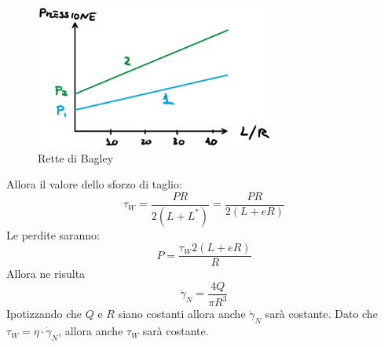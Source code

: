 \begin{figure}
\centering
\includegraphics[width = 0.7\textwidth]{gfx/Bagley}
\caption{Rette di Bagley}
\label{fig:Bagley}
\end{figure}

Allora il valore dello sforzo di taglio:
\begin{equation}
\tau_W = \frac{PR}{2(L + L^*)} = \frac{PR}{2(L + eR)}
\end{equation}
Le perdite saranno:
\begin{equation}
P = \frac{\tau_W 2(L + eR)}{R}
\end{equation}
Allora ne risulta
\begin{equation}
\dot{\gamma}_N = \frac{4Q}{\pi R^3}
\end{equation}
Ipotizzando  che $Q$ e $R$ siano costanti allora anche $\dot{\gamma}_N$ sarà costante.
Dato che $\tau_W = \eta \cdot \dot{\gamma}_N$, allora anche $\tau_W$ sarà costante.
